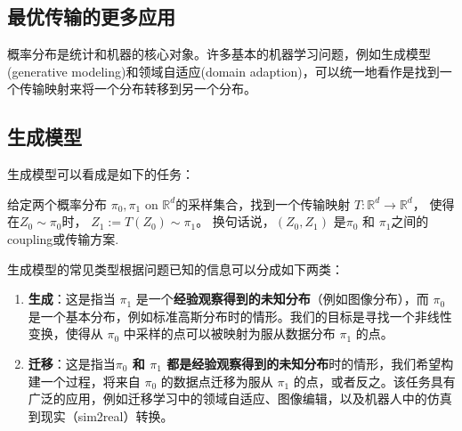 \documentclass[lang=cn,newtx,10pt,scheme=chinese,chinesefont=nofont,citestyle=gb7714-2015, bibstyle=gb7714-2015]{elegantbook}
\begin{document}
\begin{refsection}


\section{最优传输的更多应用}
概率分布是统计和机器的核心对象。许多基本的机器学习问题，例如生成模型(generative modeling)和领域自适应(domain adaption)，可以统一地看作是找到一个传输映射来将一个分布转移到另一个分布。
\subsection{生成模型}
生成模型可以看成是如下的任务：
 \begin{problem}
       给定两个概率分布 $\pi_0, \pi_1$ on $\mathbb{R}^d$的采样集合，找到一个传输映射 $T\colon\mathbb{R}^d\to\mathbb{R}^d$， 使得在$Z_0 \sim \pi_0$时， $Z_1 := T(Z_0)\sim \pi_1$。 换句话说，$(Z_0,Z_1)$ 是$\pi_0$ 和 $\pi_1$之间的coupling或传输方案.
    \end{problem}
生成模型的常见类型根据问题已知的信息可以分成如下两类：
    \begin{enumerate}
    \item \textbf{生成}：这是指当 $\pi_1$ 是一个\textbf{经验观察得到的未知分布}（例如图像分布），而 $\pi_0$ 是一个基本分布，例如标准高斯分布时的情形。我们的目标是寻找一个非线性变换，使得从 $\pi_0$ 中采样的点可以被映射为服从数据分布 $\pi_1$ 的点。

    \item \textbf{迁移}：这是指当\textbf{$\pi_0$ 和 $\pi_1$ 都是经验观察得到的未知分布}时的情形，我们希望构建一个过程，将来自 $\pi_0$ 的数据点迁移为服从 $\pi_1$ 的点，或者反之。该任务具有广泛的应用，例如迁移学习中的领域自适应、图像编辑，以及机器人中的仿真到现实（sim2real）转换。
\end{enumerate}


\end{refsection}
\end{document}
